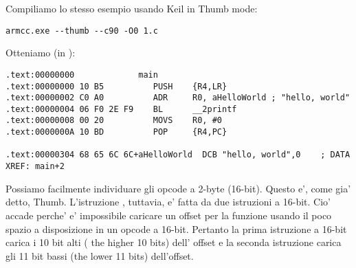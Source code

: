 \subsectionold{\NonOptimizingKeilVI (\ThumbMode)}

Compiliamo lo stesso esempio usando Keil in Thumb mode:

\begin{lstlisting}
armcc.exe --thumb --c90 -O0 1.c 
\end{lstlisting}

Otteniamo (in \IDA):

\begin{lstlisting}[caption=\NonOptimizingKeilVI (\ThumbMode) + \IDA]
.text:00000000             main
.text:00000000 10 B5          PUSH    {R4,LR}
.text:00000002 C0 A0          ADR     R0, aHelloWorld ; "hello, world"
.text:00000004 06 F0 2E F9    BL      __2printf
.text:00000008 00 20          MOVS    R0, #0
.text:0000000A 10 BD          POP     {R4,PC}

.text:00000304 68 65 6C 6C+aHelloWorld  DCB "hello, world",0    ; DATA XREF: main+2
\end{lstlisting}

Possiamo facilmente individuare gli opcode a 2-byte (16-bit). Questo e', come gia' detto, Thumb.
L'istruzione  , tuttavia, e' fatta da due istruzioni a 16-bit.
Cio' accade perche' e' impossibile caricare un offset per la funzione \printf usando il poco spazio a disposizione in un opcode a 16-bit.
Pertanto la prima istruzione a 16-bit carica i 10 bit alti ( the higher 10 bits) dell' offset e la seconda istruzione carica
gli 11 bit bassi (the lower 11 bits) dell'offset.


